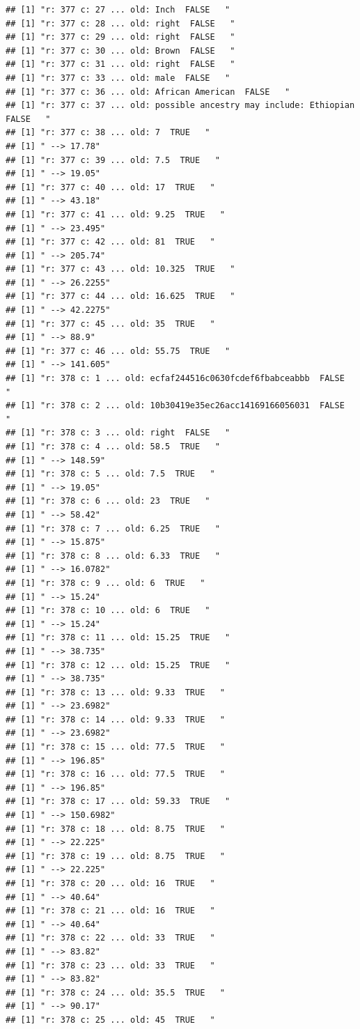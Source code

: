 \documentclass[]{article}
\begin{document}
\begin{verbatim}
## [1] "r: 377 c: 27 ... old: Inch  FALSE   "
## [1] "r: 377 c: 28 ... old: right  FALSE   "
## [1] "r: 377 c: 29 ... old: right  FALSE   "
## [1] "r: 377 c: 30 ... old: Brown  FALSE   "
## [1] "r: 377 c: 31 ... old: right  FALSE   "
## [1] "r: 377 c: 33 ... old: male  FALSE   "
## [1] "r: 377 c: 36 ... old: African American  FALSE   "
## [1] "r: 377 c: 37 ... old: possible ancestry may include: Ethiopian  FALSE   "
## [1] "r: 377 c: 38 ... old: 7  TRUE   "
## [1] " --> 17.78"
## [1] "r: 377 c: 39 ... old: 7.5  TRUE   "
## [1] " --> 19.05"
## [1] "r: 377 c: 40 ... old: 17  TRUE   "
## [1] " --> 43.18"
## [1] "r: 377 c: 41 ... old: 9.25  TRUE   "
## [1] " --> 23.495"
## [1] "r: 377 c: 42 ... old: 81  TRUE   "
## [1] " --> 205.74"
## [1] "r: 377 c: 43 ... old: 10.325  TRUE   "
## [1] " --> 26.2255"
## [1] "r: 377 c: 44 ... old: 16.625  TRUE   "
## [1] " --> 42.2275"
## [1] "r: 377 c: 45 ... old: 35  TRUE   "
## [1] " --> 88.9"
## [1] "r: 377 c: 46 ... old: 55.75  TRUE   "
## [1] " --> 141.605"
## [1] "r: 378 c: 1 ... old: ecfaf244516c0630fcdef6fbabceabbb  FALSE   "
## [1] "r: 378 c: 2 ... old: 10b30419e35ec26acc14169166056031  FALSE   "
## [1] "r: 378 c: 3 ... old: right  FALSE   "
## [1] "r: 378 c: 4 ... old: 58.5  TRUE   "
## [1] " --> 148.59"
## [1] "r: 378 c: 5 ... old: 7.5  TRUE   "
## [1] " --> 19.05"
## [1] "r: 378 c: 6 ... old: 23  TRUE   "
## [1] " --> 58.42"
## [1] "r: 378 c: 7 ... old: 6.25  TRUE   "
## [1] " --> 15.875"
## [1] "r: 378 c: 8 ... old: 6.33  TRUE   "
## [1] " --> 16.0782"
## [1] "r: 378 c: 9 ... old: 6  TRUE   "
## [1] " --> 15.24"
## [1] "r: 378 c: 10 ... old: 6  TRUE   "
## [1] " --> 15.24"
## [1] "r: 378 c: 11 ... old: 15.25  TRUE   "
## [1] " --> 38.735"
## [1] "r: 378 c: 12 ... old: 15.25  TRUE   "
## [1] " --> 38.735"
## [1] "r: 378 c: 13 ... old: 9.33  TRUE   "
## [1] " --> 23.6982"
## [1] "r: 378 c: 14 ... old: 9.33  TRUE   "
## [1] " --> 23.6982"
## [1] "r: 378 c: 15 ... old: 77.5  TRUE   "
## [1] " --> 196.85"
## [1] "r: 378 c: 16 ... old: 77.5  TRUE   "
## [1] " --> 196.85"
## [1] "r: 378 c: 17 ... old: 59.33  TRUE   "
## [1] " --> 150.6982"
## [1] "r: 378 c: 18 ... old: 8.75  TRUE   "
## [1] " --> 22.225"
## [1] "r: 378 c: 19 ... old: 8.75  TRUE   "
## [1] " --> 22.225"
## [1] "r: 378 c: 20 ... old: 16  TRUE   "
## [1] " --> 40.64"
## [1] "r: 378 c: 21 ... old: 16  TRUE   "
## [1] " --> 40.64"
## [1] "r: 378 c: 22 ... old: 33  TRUE   "
## [1] " --> 83.82"
## [1] "r: 378 c: 23 ... old: 33  TRUE   "
## [1] " --> 83.82"
## [1] "r: 378 c: 24 ... old: 35.5  TRUE   "
## [1] " --> 90.17"
## [1] "r: 378 c: 25 ... old: 45  TRUE   "

\end{verbatim}
\end{document}
